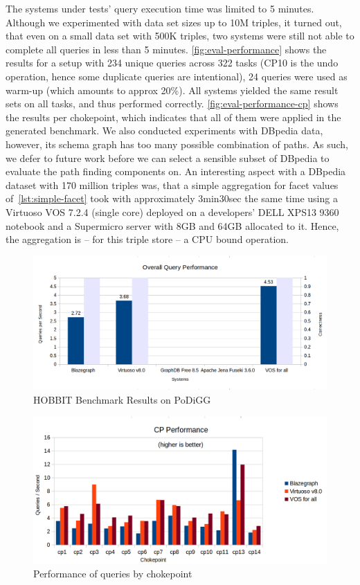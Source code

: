The systems under tests' query execution time was limited to 5 minutes. Although we experimented with data set sizes up to 10M triples, it turned out, that even on a small data set with 500K triples, two systems were still not able to complete all queries in less than 5 minutes. \autoref{fig:eval-performance} shows the results for a setup with 234 unique queries across 322 tasks (CP10 is the undo operation, hence some duplicate queries are intentional), 24 queries were used as warm-up (which amounts to approx 20\%). All systems yielded the same result sets on all tasks, and thus performed correctly. \autoref{fig:eval-performance-cp} shows the results per chokepoint, which indicates that all of them were applied in the generated benchmark.
We also conducted experiments with DBpedia data, however, its schema graph has too many possible combination of paths. As such, we defer to future work before we can select a sensible subset of DBpedia to evaluate the path finding components on.
An interesting aspect with a DBpedia dataset with 170 million triples was, that a simple aggregation for facet values of~\autoref{lst:simple-facet} took with approximately 3min30sec the same time using a Virtuoso VOS 7.2.4 (single core) deployed on a developers' DELL XPS13 9360 notebook and a Supermicro server with 8GB and 64GB allocated to it. Hence, the aggregation is -- for this triple store -- a CPU bound operation.

\begin{figure}
\centering
\includegraphics[width=\textwidth]{images/eval-performance-chart.png}
\caption{HOBBIT Benchmark Results on PoDiGG}
\label{fig:eval-performance}
\end{figure}

\begin{figure}
\centering
\includegraphics[width=\textwidth]{images/eval-performance-chart-cp.png}
\caption{Performance of queries by chokepoint}
\label{fig:eval-performance-cp}
\end{figure}


